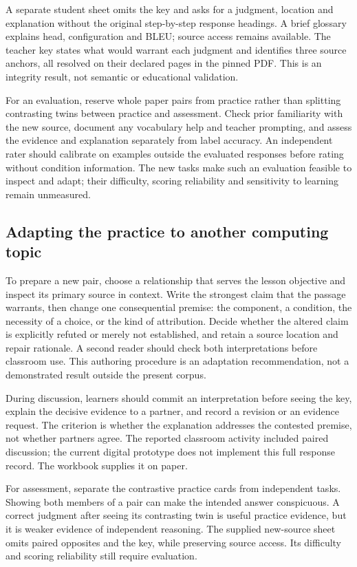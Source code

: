 A separate student sheet omits the key and asks for a judgment, location and explanation without the original step-by-step response headings. A brief glossary explains head, configuration and BLEU; source access remains available. The teacher key states what would warrant each judgment and identifies three source anchors, all resolved on their declared pages in the pinned PDF. This is an integrity result, not semantic or educational validation.

For an evaluation, reserve whole paper pairs from practice rather than splitting contrasting twins between practice and assessment. Check prior familiarity with the new source, document any vocabulary help and teacher prompting, and assess the evidence and explanation separately from label accuracy. An independent rater should calibrate on examples outside the evaluated responses before rating without condition information. The new tasks make such an evaluation feasible to inspect and adapt; their difficulty, scoring reliability and sensitivity to learning remain unmeasured.

\subsection{Adapting the practice to another computing topic}
To prepare a new pair, choose a relationship that serves the lesson objective and inspect its primary source in context. Write the strongest claim that the passage warrants, then change one consequential premise: the component, a condition, the necessity of a choice, or the kind of attribution. Decide whether the altered claim is explicitly refuted or merely not established, and retain a source location and repair rationale. A second reader should check both interpretations before classroom use. This authoring procedure is an adaptation recommendation, not a demonstrated result outside the present corpus.

During discussion, learners should commit an interpretation before seeing the key, explain the decisive evidence to a partner, and record a revision or an evidence request. The criterion is whether the explanation addresses the contested premise, not whether partners agree. The reported classroom activity included paired discussion; the current digital prototype does not implement this full response record. The workbook supplies it on paper.

For assessment, separate the contrastive practice cards from independent tasks. Showing both members of a pair can make the intended answer conspicuous. A correct judgment after seeing its contrasting twin is useful practice evidence, but it is weaker evidence of independent reasoning. The supplied new-source sheet omits paired opposites and the key, while preserving source access. Its difficulty and scoring reliability still require evaluation.

